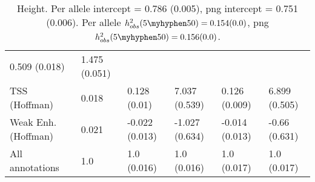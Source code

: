 \documentclass[11pt]{article}
\begin{document}
\begin{table}[H]
\begin{center}
\begin{tabular}{l|lllll}
0.509 (0.018) & 1.475 (0.051) \\
TSS (Hoffman)  &  0.018 & 0.128 (0.01) & 7.037 (0.539) &
0.126 (0.009) & 6.899 (0.505) \\
Weak Enh. (Hoffman)  &  0.021 & -0.022 (0.013) & -1.027 (0.634) &
-0.014 (0.013) & -0.66 (0.631) \\
All annotations  &  1.0 & 1.0 (0.016) & 1.0 (0.016) &
1.0 (0.017) & 1.0 (0.017) \\
\end{tabular}
\caption{Height.
Per allele intercept = 0.786 (0.005),
png intercept = 0.751 (0.006).
Per allele $h^2_{obs}(5\myhyphen50) = 0.154 (0.0)$,
png $h^2_{obs}(5\myhyphen50) = 0.156 (0.0)$.}
\end{center}
\end{table}
\end{document}
